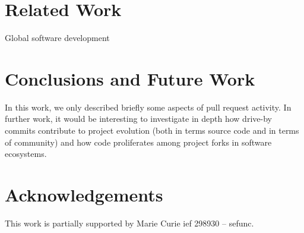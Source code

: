 \documentclass{sig-alternate}
\begin{document}
\section{Related Work}

\cite{Bird09}
\cite{Cornf10}
\cite{Dabbi12}
\cite{Bird12}
\cite{Barr12}
\cite{Buffe99}
\cite{Mens02}
\cite{Shiha12}

Global software development
\section{Conclusions and Future Work}

In this work, we only described briefly some aspects of pull request activity.
In further work, it would be interesting to investigate in depth how drive-by
commits contribute to project evolution (both in terms source code and in
terms of community) and how code proliferates among project
forks in software ecosystems.

\section*{Acknowledgements}
This work is partially supported by Marie Curie {\sc ief} 298930 -- {\sc sefunc}.



\end{document}
